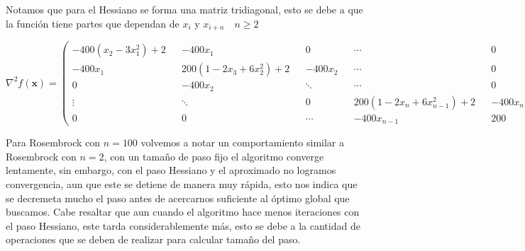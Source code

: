 \documentclass{article}
\begin{document}
\begin{enumerate}
Notamos que para el Hessiano se forma una matriz tridiagonal, esto se debe a que la función tiene partes que dependan de $x_i$ y $x_{i+n} \quad n \geq 2$

$$
\nabla^2f(\boldsymbol{x})= 
 \begin{pmatrix}
  -400(x_2 - 3x_1^2) + 2 && -400x_1 && 0 && \cdots && 0\\
  -400x_1 && 200(1 - 2 x_3 + 6x_2^2) + 2 && -400x_2 && \cdots && 0\\
  0 && -400x_2 && \ddots && \cdots && 0 \\
  \vdots && \ddots && 0 && 200(1 - 2 x_n + 6x_{n-1}^2) + 2 && -400x_{n-1}\\
  0 && 0 && \cdots && -400x_{n-1} && 200

 \end{pmatrix}
$$

Para Rosembrock con $n = 100$ volvemos a notar un comportamiento similar a Rosembrock con $n = 2$, con un tamaño de paso fijo el algoritmo converge lentamente, sin embargo, con el paso Hessiano y el aproximado no logramos convergencia, aun que este se detiene de manera muy rápida, esto nos indica que se decremeta mucho el paso antes de acercarnos suficiente al óptimo global que buscamos. Cabe resaltar que aun cuando el algoritmo hace menos iteraciones con el paso Hessiano, este tarda considerablemente más, esto se debe a la cantidad de operaciones que se deben de realizar para calcular tamaño del paso.


\end{enumerate}
\end{document}
